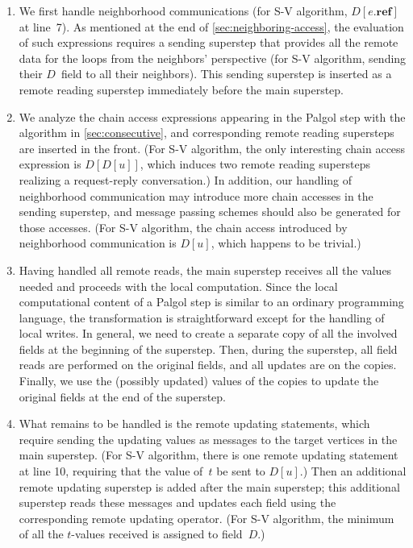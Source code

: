 \documentclass{sokendai_thesis} %
\begin{document}
\begin{enumerate}
\item We first handle neighborhood communications (for S-V algorithm, $D[e.\mathbf{ref}]$ at line~7).
As mentioned at the end of \autoref{sec:neighboring-access}, the evaluation of such expressions requires a sending superstep that provides all the remote data for the loops from the neighbors' perspective (for S-V algorithm, sending their $D$~field to all their neighbors).
This sending superstep is inserted as a remote reading superstep immediately before the main superstep.

\item We analyze the chain access expressions appearing in the Palgol step with the algorithm in \autoref{sec:consecutive}, and corresponding remote reading supersteps are inserted in the front.
(For S-V algorithm, the only interesting chain access expression is $D[D[u]]$, which induces two remote reading supersteps realizing a request-reply conversation.)
In addition, our handling of neighborhood communication may introduce more chain accesses in the sending superstep, and message passing schemes should also be generated for those accesses.
(For S-V algorithm, the chain access introduced by neighborhood communication is $D[u]$, which happens to be trivial.)

\item Having handled all remote reads, the main superstep receives all the values needed and proceeds with the local computation.
Since the local computational content of a Palgol step is similar to an ordinary programming language, the transformation is straightforward except for the handling of local writes.
In general, we need to create a separate copy of all the involved fields at the beginning of the superstep.
Then, during the superstep, all field reads are performed on the original fields, and all updates are on the copies.
Finally, we use the (possibly updated) values of the copies to update the original fields at the end of the superstep.

\item What remains to be handled is the remote updating statements, which require sending the updating values as messages to the target vertices in the main superstep.
(For S-V algorithm, there is one remote updating statement at line 10, requiring that the value of~$t$ be sent to $D[u]$.)
Then an additional remote updating superstep is added after the main superstep; this additional superstep reads these messages and updates each field using the corresponding remote updating operator.
(For S-V algorithm, the minimum of all the $t$-values received is assigned to field~$D$.)

\end{enumerate}
\end{document}
